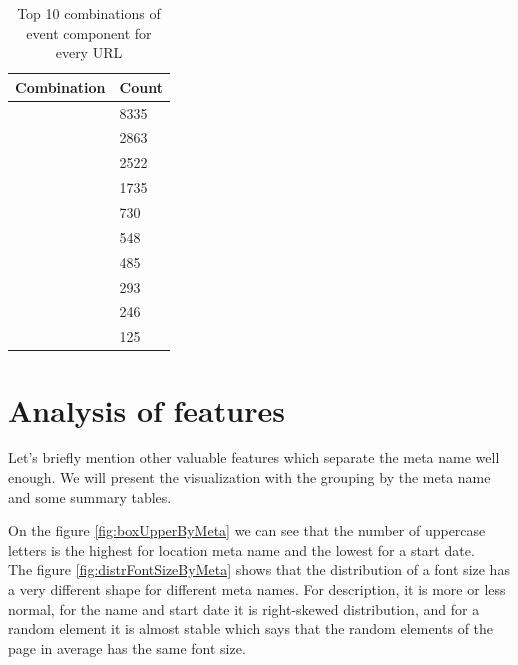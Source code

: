 \begin{table}
\begin{center}
{\renewcommand{\arraystretch}{1.5}
\begin{tabular}{| p{8cm} | p{2cm}|}
\hline
\textbf{Combination}    &    \textbf{Count}\\
\hline
['name']    &    8335\\
\hline
['location', 'name']    &    2863\\
\hline
['name', 'startDate']    &    2522\\
\hline
['location', 'name', 'startDate']    &    1735\\
\hline
['description', 'name']    &    730\\
\hline
['description', 'name', 'startDate']    &    548\\
\hline
['description', 'location', 'name']    &    485\\
\hline
['description', 'location', 'name', 'startDate']    &    293\\
\hline
['name', 'startDate', 'startDate']    &    246\\
\hline
['location', 'name', 'startDate', 'startDate']    &    125\\
\hline
\end{tabular}}
\caption{Top 10 combinations of event component for every URL}
\label{table:top10comb}
\end{center}
\end{table}    

\section{Analysis of features}
Let's briefly mention other valuable features which separate the meta name well enough. We will present the visualization with the grouping by the meta name and some summary tables.

On the figure \ref{fig:boxUpperByMeta} we can see that the number of uppercase letters is the highest for location meta name and the lowest for a start date.\\

The figure \ref{fig:distrFontSizeByMeta} shows that the distribution of a font size has a very different shape for different meta names. For description, it is more or less normal, for the name and start date it is right-skewed distribution, and for a random element it is almost stable which says that the random elements of the page in average has the same font size.\\   

